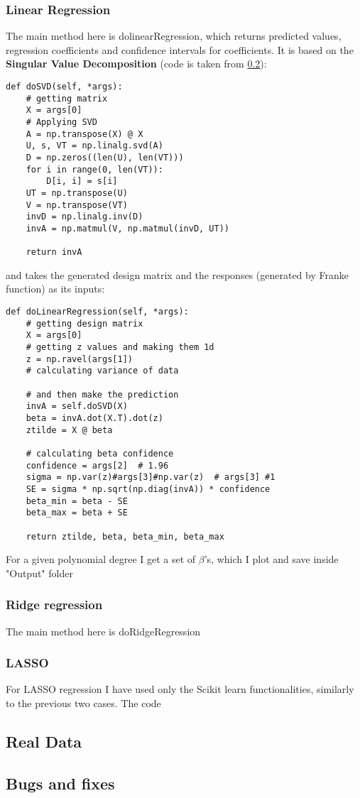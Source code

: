 \subsubsection{Linear Regression}
The main method here is dolinearRegression, which returns predicted values, regression coefficients and confidence intervals for coefficients. It is based on the \textbf{Singular Value Decomposition} (code is taken from \ref{}):
\begin{lstlisting}
def doSVD(self, *args):
    # getting matrix
    X = args[0]
    # Applying SVD
    A = np.transpose(X) @ X
    U, s, VT = np.linalg.svd(A)
    D = np.zeros((len(U), len(VT)))
    for i in range(0, len(VT)):
        D[i, i] = s[i]
    UT = np.transpose(U)
    V = np.transpose(VT)
    invD = np.linalg.inv(D)
    invA = np.matmul(V, np.matmul(invD, UT))

    return invA
\end{lstlisting}
and takes the generated design matrix and the responses (generated by Franke function) as its inputs:
\begin{lstlisting}
def doLinearRegression(self, *args):
    # getting design matrix
    X = args[0]
    # getting z values and making them 1d
    z = np.ravel(args[1])
    # calculating variance of data

    # and then make the prediction
    invA = self.doSVD(X)
    beta = invA.dot(X.T).dot(z)
    ztilde = X @ beta

    # calculating beta confidence
    confidence = args[2]  # 1.96
    sigma = np.var(z)#args[3]#np.var(z)  # args[3] #1
    SE = sigma * np.sqrt(np.diag(invA)) * confidence
    beta_min = beta - SE
    beta_max = beta + SE

    return ztilde, beta, beta_min, beta_max
\end{lstlisting}
For a given polynomial degree I get a set of $\beta$'s, which I plot and save inside "Output" folder

\subsubsection{Ridge regression}

The main method here is doRidgeRegression

\subsubsection{LASSO}

For LASSO regression I have used only the Scikit learn functionalities, similarly to the previous two cases. The code 

\subsection{Real Data}


\subsection{Bugs and fixes}




